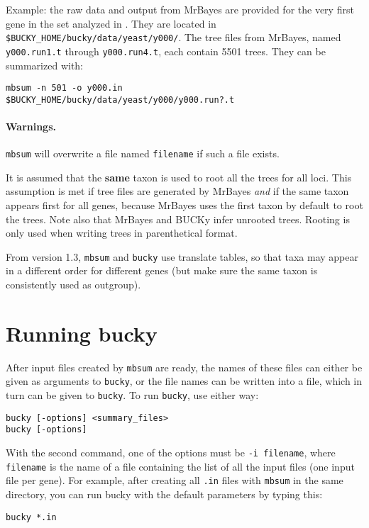 \documentclass[12pt,english,final,letterpaper]{article}
\newcommand{\bu}{BUCKy}
\begin{document}
\noindent
Example: the raw data and output from MrBayes are provided for the
very first gene in the set analyzed in \cite{ane-etal-2008}.
They are located in \verb+$BUCKY_HOME/bucky/data/yeast/y000/+. 
The tree files from MrBayes, named \verb+y000.run1.t+ through
\verb+y000.run4.t+, each contain 5501 trees. 
They can be summarized with:
\begin{verbatim}
mbsum -n 501 -o y000.in    $BUCKY_HOME/bucky/data/yeast/y000/y000.run?.t
\end{verbatim}

\paragraph{Warnings.}  
{\tt mbsum} will overwrite a file named \verb+filename+
if such a file exists.

It is assumed that the {\bf same} taxon is used to root all the trees
for all loci. This assumption is met if tree files are generated by MrBayes
{\it and} if the same taxon appears first for all genes, because MrBayes
uses the first taxon by default to root the trees. Note also that MrBayes
and \bu{} infer unrooted trees. Rooting is only used when writing 
trees in parenthetical format.

From version 1.3, \texttt{mbsum} and \texttt{bucky} use translate tables,
so that taxa may appear in a different order for different genes (but make sure
the same taxon is consistently used as outgroup).



\section{Running bucky}
After input files created by {\tt mbsum} are ready, the names of these
files can either be given as arguments to {\tt bucky}, or the file 
names can be written into a file, which in turn can be given to
{\tt bucky}. To run {\tt bucky}, use either way:
\begin{verbatim}
bucky [-options] <summary_files> 
bucky [-options]
\end{verbatim}
With the second command, one of the options must be 
{\tt -i filename}, where {\tt filename} is the name of a file
containing the list of all the input files (one input file per gene).
For example, after creating all {\tt .in} files with {\tt mbsum} in the same 
directory, you can run bucky with the default parameters by typing this:
\begin{verbatim}
bucky *.in
\end{verbatim}
\end{document}
